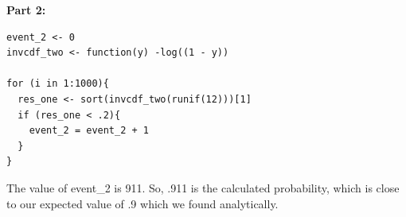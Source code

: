 \documentclass[svgnames]{article}
\begin{document}
\textbf{Part 2:}

\begin{lstlisting}
event_2 <- 0
invcdf_two <- function(y) -log((1 - y))

for (i in 1:1000){
  res_one <- sort(invcdf_two(runif(12)))[1]
  if (res_one < .2){
    event_2 = event_2 + 1
  }
}

\end{lstlisting}

The value of event\_2 is 911. So, .911 is the calculated probability, which is close to our expected value of .9 which we found analytically.
\end{document}
